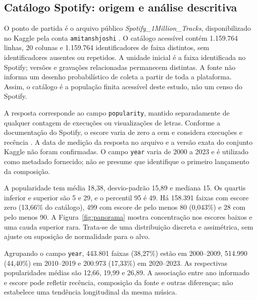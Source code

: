 \subsection{Catálogo Spotify: origem e análise descritiva}\label{subsec:spotify}
O ponto de partida é o arquivo público \textit{Spotify\_1Million\_Tracks}, disponibilizado no Kaggle pela conta \texttt{amitanshjoshi} \cite{spotifydataset}. O catálogo acessível contém 1.159.764 linhas, 20 colunas e 1.159.764 identificadores de faixa distintos, sem identificadores ausentes ou repetidos. A unidade inicial é a faixa identificada no Spotify; versões e gravações relacionadas permanecem distintas. A fonte não informa um desenho probabilístico de coleta a partir de toda a plataforma. Assim, o catálogo é a população finita acessível deste estudo, não um censo do Spotify.

A resposta corresponde ao campo \texttt{popularity}, mantido separadamente de qualquer contagem de execuções ou visualizações de letras. Conforme a documentação do Spotify, o escore varia de zero a cem e considera execuções e recência \cite{spotifydocs}. A data de medição da resposta no arquivo e a versão exata do conjunto Kaggle não foram confirmadas. O campo \texttt{year} varia de 2000 a 2023 e é utilizado como metadado fornecido; não se presume que identifique o primeiro lançamento da composição.

A popularidade tem média 18,38, desvio-padrão 15,89 e mediana 15. Os quartis inferior e superior são 5 e 29, e o percentil 95 é 49. Há 158.391 faixas com escore zero (13,66\% do catálogo), 499 com escore de pelo menos 80 (0,043\%) e 28 com pelo menos 90. A Figura~\ref{fig:panorama} mostra concentração nos escores baixos e uma cauda superior rara. Trata-se de uma distribuição discreta e assimétrica, sem ajuste ou suposição de normalidade para o alvo.


Agrupando o campo \texttt{year}, 443.801 faixas (38,27\%) estão em 2000--2009, 514.990 (44,40\%) em 2010--2019 e 200.973 (17,33\%) em 2020--2023. As respectivas popularidades médias são 12,66, 19,99 e 26,89. A associação entre ano informado e escore pode refletir recência, composição da fonte e outras diferenças; não estabelece uma tendência longitudinal da mesma música.

